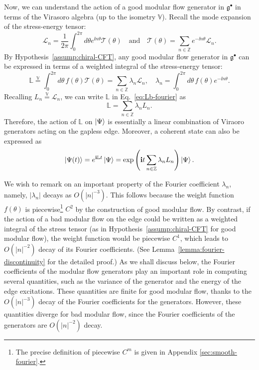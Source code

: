 \documentclass[12pt, nofootinbib]{article}
\theoremstyle{plain}
\theoremstyle{assumption}
\theoremstyle{definition}
\theoremstyle{plain}
\theoremstyle{plain}
\theoremstyle{plain}
\theoremstyle{plain}
\theoremstyle{plain}
\def\veq{\stackrel{\mathbb{V}}{=}}
\def\Lb{\mathbb{L}}
\def\Lcft{\mathscr{L}}
\def\Tcft{\mathscr{T}}
\def\({\left(}
\def\){\right)}
\def\gc{\mathfrak{g}^{\bullet}}
\begin{document}
Now, we can understand the action of a good modular flow generator in $\gc$ in terms of the Virasoro algebra (up to the isometry $\mathbb{V}$).  
Recall the mode expansion of the stress-energy tensor: 
\begin{equation}\label{eq:L-T}
    \Lcft_n = \frac{1}{2\pi} \int_0^{2\pi} d\theta e^{\ii n\theta} \Tcft(\theta) \quad \text{and} \quad \Tcft(\theta) = \sum_{n\in\mathbb{Z}} e^{-\ii n\theta}\Lcft_n. 
\end{equation}
By Hypothesis~\ref{assump:chiral-CFT}, any good modular flow generator in $\gc$ can be expressed in terms of a weighted integral of the stress-energy tensor:
\begin{equation}\label{eq:Lb-fourier}
    \Lb \veq \int_0^{2\pi} d\theta \, f(\theta)\Tcft(\theta) = \sum_{n\in\mathbb{Z}}\lambda_n \Lcft_n,\quad \lambda_n = \int_0^{2\pi} d\theta \, f(\theta)e^{-\ii n \theta}.
\end{equation}
Recalling $L_n\veq \Lcft_n$, we can write $\Lb$ in Eq.~\eqref{eq:Lb-fourier} as 
\begin{equation}\label{eq:L-expand}
    \Lb = \sum_{n\in\mathbb{Z}} \lambda_n L_n. 
\end{equation}
Therefore, the action of $\Lb$ on $\left|\Psi\right\rangle$ is essentially a linear combination of Viraoro generators acting on the gapless edge. Moreover, a coherent state can also be expressed as 
\begin{equation}\label{eq:coherent-L}
    \ket{\Psi(t)} =e^{\ii \Lb t}\ket{\Psi} = \exp\( \ii t \sum_{n\in\mathbb{Z}} \lambda_n L_n \)\ket{\Psi}.
\end{equation}

We wish to remark on an important property of the Fourier coefficient $\lambda_n$, namely, $|\lambda_n|$ decays as $O(|n|^{-3})$. This follows because the weight function $f(\theta)$ is piecewise\footnote{The precise definition of piecewise $C^m$ is given in Appendix \ref{sec:smooth-fourier}.} $C^2$ by the construction of good modular flow. By contrast, if the action of a bad modular flow on the edge could be written as a weighted integral of the stress tensor (as in Hypothesis~\ref{assump:chiral-CFT} for good modular flow), the weight function would be piecewise $C^1$, which leads to $O(|n|^{-2})$ decay of its Fourier coefficients.
(See Lemma~\ref{lemma:fourier-discontinuity} for the detailed proof.) As we shall discuss below, the Fourier coefficients of the modular flow generators play an important role in computing several quantities, such as the variance of the generator and the energy of the edge excitations. These quantities are finite for good modular flow, thanks to the $O(|n|^{-3})$ decay of the Fourier coefficients for the generators. However, these quantities diverge for bad modular flow, since the Fourier coefficients of the generators are $O(|n|^{-2})$ decay.  
\end{document}
